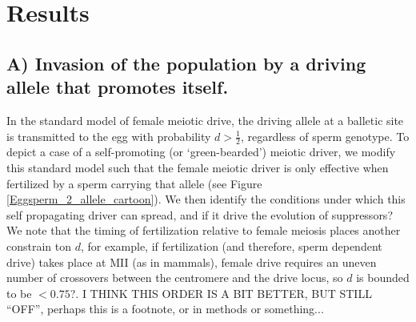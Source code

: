 \documentclass[12pt,letterpaper]{article}
\newcommand{\yb}[1]{{ \color{blue} #1}}
\begin{document}
\section*{Results}

\subsection*{ A) Invasion of the population by a driving allele that promotes
itself.}


In the standard model of female meiotic drive, the driving allele at a balletic site is transmitted to the egg with probability  $d > \frac{1}{2}$, regardless of sperm genotype. 
\yb{ To depict a case of a self-promoting (or `green-bearded') meiotic driver,  we modify this standard model such that the female meiotic driver is only effective when fertilized by a sperm carrying that allele (see Figure \ref{Eggsperm_2_allele_cartoon}).}
We then identify the conditions under which this self propagating driver can spread, and if it drive the evolution of suppressors? 
\yb{We note that the timing of fertilization relative to female meiosis places another constrain ton $d$, 
	for example, if fertilization (and therefore, sperm dependent drive) takes place at MII (as in mammals),
	female drive requires an uneven number of crossovers between the centromere and the drive locus, 
	so $d$ is bounded to be $<0.75$?.}  
\yb{I THINK THIS ORDER IS A BIT BETTER, BUT STILL ``OFF'', perhaps this is a footnote, or in methods or something...}


\end{document}

